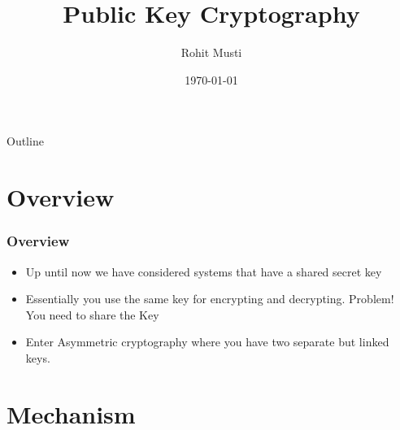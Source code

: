 \documentclass[handout]{beamer}
\title{Public Key Cryptography}
\author{Rohit Musti}
\institute{CUNY - Hunter College}
\date{\today}
\begin{document}
 
\frame{\titlepage}

\begin{frame}{Outline}
  \tableofcontents
\end{frame}

\section{Overview}

\begin{frame}
    \frametitle{Overview}
    \begin{itemize}
        \pause
        \item Up until now we have considered systems that have a shared secret key
        \pause
        \item Essentially you use the same key for encrypting and decrypting. \pause Problem! You need to share the Key
        \pause
        \item Enter Asymmetric cryptography where you have two separate but linked keys.
    \end{itemize}
\end{frame}

\section{Mechanism}
\end{document}
